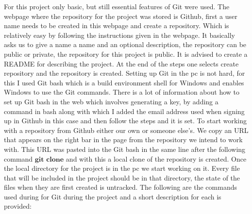 \documentclass{article}
\begin{document}
For this project only basic, but still essential features of Git were used. The webpage where the repository for the project was stored is Github, first a user name needs to be created in this webpage and create a repository. Which is relatively easy by following the instructions given in the webpage. It basically asks us to give a name a name and an optional description, the repository can be public or private, the repository for this project is public. It is advised to create a README for describing the project. At the end of the steps one selects create repository and the repository is created. Setting up Git in the pc is not hard, for this I used Git bash which is a build environment shell for Windows and enables Windows to use the Git commands.
There is a lot of information about how to set up Git bash in the web which involves generating a key, by adding a command in bash along with which I added the email address used when signing up in Github in this case and then follow the steps and it is set. 
To start working with a repository from Github either our own or someone else's. We copy an URL that appears on the right bar in the page from the repository we intend to work with. 
This URL was pasted into the Git bash  in the same line after the following command $\textbf{git clone}$ and with this a local clone of the repository is created.
Once the local directory for the project is in the pc we start working on it. Every file that will be included in the project should be in that directory, the state of the files when they are first created is untracked. The following are the commands used during for Git during the project and a short description for each is provided:
\end{document}
